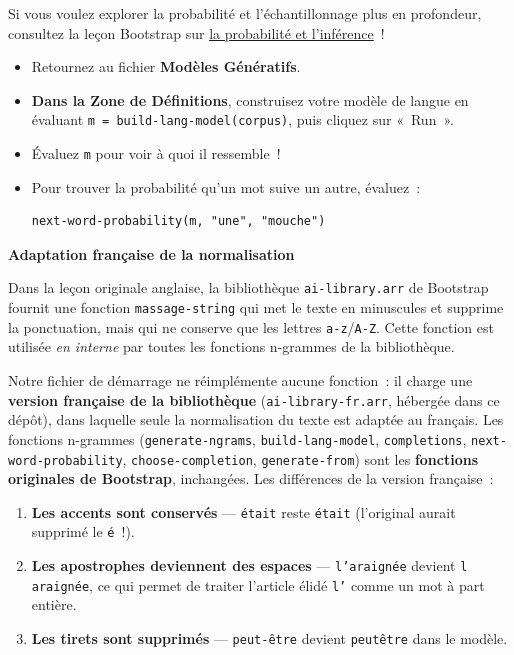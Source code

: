 \documentclass[12pt,a4paper]{article}
\begin{document}
\begin{instructornotes}
  Si vous voulez explorer la probabilité et l'échantillonnage plus en profondeur, consultez la leçon Bootstrap sur \href{https://www.bootstrapworld.org/materials/fall2026/en-us/lessons/probability-inference/index.shtml}{la probabilité et l'inférence}~!
\end{instructornotes}

\begin{activitybox}
  \begin{itemize}
    \item Retournez au fichier \textbf{Modèles Génératifs}.
    \item \textbf{Dans la Zone de Définitions}, construisez votre modèle de langue en évaluant \texttt{m = build-lang-model(corpus)}, puis cliquez sur «~Run~».
    \item Évaluez \texttt{m} pour voir à quoi il ressemble~!
    \item Pour trouver la probabilité qu'un mot suive un autre, évaluez~:
    \begin{lstlisting}
next-word-probability(m, "une", "mouche")
    \end{lstlisting}
  \end{itemize}
\end{activitybox}

\begin{keypointbox}
   \textbf{Adaptation française de la normalisation}

   Dans la leçon originale anglaise, la bibliothèque \texttt{ai-library.arr} de Bootstrap fournit une fonction \texttt{massage-string} qui met le texte en minuscules et supprime la ponctuation, mais qui ne conserve que les lettres \texttt{a-z}/\texttt{A-Z}. Cette fonction est utilisée \emph{en interne} par toutes les fonctions n-grammes de la bibliothèque.

   Notre fichier de démarrage ne réimplémente aucune fonction~: il charge une \textbf{version française de la bibliothèque} (\texttt{ai-library-fr.arr}, hébergée dans ce dépôt), dans laquelle seule la normalisation du texte est adaptée au français. Les fonctions n-grammes (\texttt{generate-ngrams}, \texttt{build-lang-model}, \texttt{completions}, \texttt{next-word-probability}, \texttt{choose-completion}, \texttt{generate-from}) sont les \textbf{fonctions originales de Bootstrap}, inchangées. Les différences de la version française~:
   \begin{enumerate}
     \item \textbf{Les accents sont conservés} — \texttt{était} reste \texttt{était} (l'original aurait supprimé le \texttt{é}~!).
     \item \textbf{Les apostrophes deviennent des espaces} — \texttt{l'araignée} devient \texttt{l araignée}, ce qui permet de traiter l'article élidé \texttt{l'} comme un mot à part entière.
     \item \textbf{Les tirets sont supprimés} — \texttt{peut-être} devient \texttt{peutêtre} dans le modèle.
   \end{enumerate}
\end{keypointbox}
\end{document}
